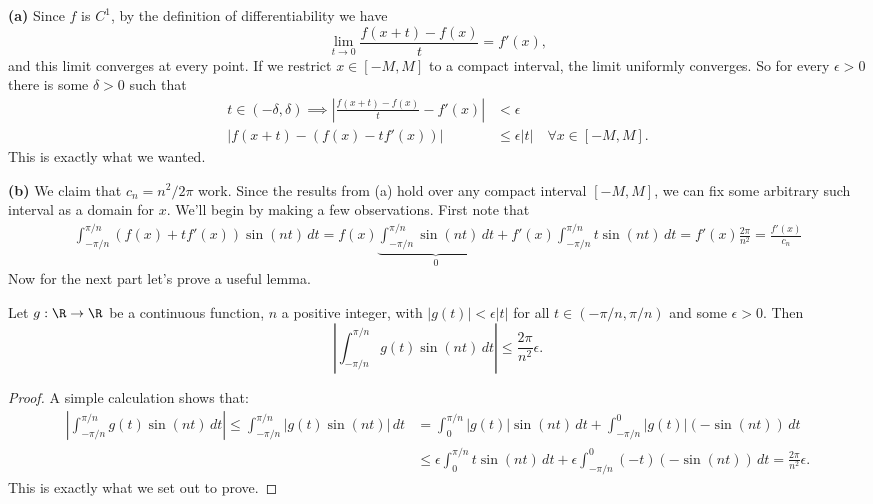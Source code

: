 \documentclass[11pt,letterpaper]{article}
\begin{document}
\begin{solution}
    \textbf{(a)} Since $f$ is $C^1$, by the definition of differentiability we have 
    \[
        \lim_{t\to 0} \frac{f(x+t)-f(x)}{t} = f'(x),
    \] 
    and this limit converges at every point. If we restrict $x\in [-M, M]$ to a compact interval, the limit uniformly converges. So for every $\epsilon>0$ there is some $\delta>0$ such that
    \[\begin{aligned}
        t\in (-\delta, \delta) \implies \left|\frac{f(x+t)-f(x)}{t} - f'(x)\right|&<\epsilon\\
        |f(x+t)-(f(x)-tf'(x))| &\leq \epsilon |t| \quad \forall x\in [-M, M].
    \end{aligned}\]
    This is exactly what we wanted.

    \textbf{(b)} We claim that $c_n=n^2/2\pi$ work. Since the results from (a) hold over any compact interval $[-M,M]$, we can fix some arbitrary such interval as a domain for $x$. We'll begin by making a few observations. First note that 
    \[\begin{aligned}
        \int^{\pi/n}_{-\pi/n}(f(x)+tf'(x))\sin(nt)\,dt = f(x)\underbrace{\int^{\pi/n}_{-\pi/n}\sin(nt)\,dt}_{0} + f'(x)\int^{\pi/n}_{-\pi/n}t\sin(nt)\,dt =f'(x)\frac{2\pi}{n^2} = \frac{f'(x)}{c_n}
    \end{aligned}\]
    Now for the next part let's prove a useful lemma.
    \begin{ilemma}
        Let $g : \R \to \R$ be a continuous function, $n$ a positive integer, with $|g(t)|<\epsilon|t|$ for all $t\in (-\pi/n, \pi/n)$ and some $\epsilon>0$. Then
        \[
            \left|\int^{\pi/n}_{-\pi/n} g(t)\sin(nt)\,dt\right| \leq \frac{2\pi}{n^2}\epsilon.
        \] 
    \end{ilemma}
    \begin{proof} A simple calculation shows that:
        \[\begin{aligned}
            \left|\int^{\pi/n}_{-\pi/n} g(t)\sin(nt)\,dt\right|\leq \int^{\pi/n}_{-\pi/n}|g(t)\sin(nt)|\,dt &= \int^{\pi/n}_0 |g(t)|\sin(nt)\,dt + \int^0_{-\pi/n} |g(t)|(-\sin(nt))\,dt\\
            &\leq \epsilon\int^{\pi/n}_{0}t\sin(nt)\,dt + \epsilon\int^0_{-\pi/n}(-t)(-\sin(nt))\,dt = \frac{2\pi}{n^2}\epsilon.
        \end{aligned}\]
        This is exactly what we set out to prove.
    \end{proof}


\end{solution}
\end{document}
